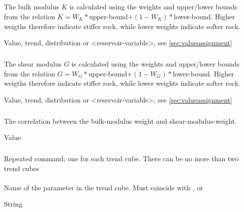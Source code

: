 {\subparagraph{}
 \slist
   \item \Description The bulk modulus $K$ is calculated using the weights and upper/lower bounds from the relation $K=W_K*$upper-bound$+(1-W_K)*$lower-bound. Higher weigths therefore indicate stiffer rock, while lower weights indicate softer rock.
   \item \Argument Value, trend, distribution or <reservoir-variable>, see \autoref{sec:valueassignment}
   \item \Default
 \elist

\subparagraph{}
 \slist
   \item \Description The shear modulus $G$ is calculated using the weights and upper/lower bounds from the relation $G=W_G*$upper-bound$+(1-W_G)*$lower-bound. Higher weigths therefore indicate stiffer rock, while lower weights indicate softer rock.
   \item \Argument Value, trend, distribution or <reservoir-variable>, see \autoref{sec:valueassignment}
   \item \Default
 \elist

\subparagraph{}
 \slist
   \item \Description The correlation between the bulk-modulus weight and shear-modulus-weight.
   \item \Argument Value
   \item {}
 \elist

\subsubsection{}
 \slist
   \item \Description Repeated command; one for each trend cube. There can be no more than two trend cubes
   \item \Argument 
   \item \Default 
 \elist

\paragraph{}
 \slist
   \item \Description Name of the parameter in the trend cube. Must coincide with ,  or 
   \item \Argument String
   \item \Default 
 \elist

}
